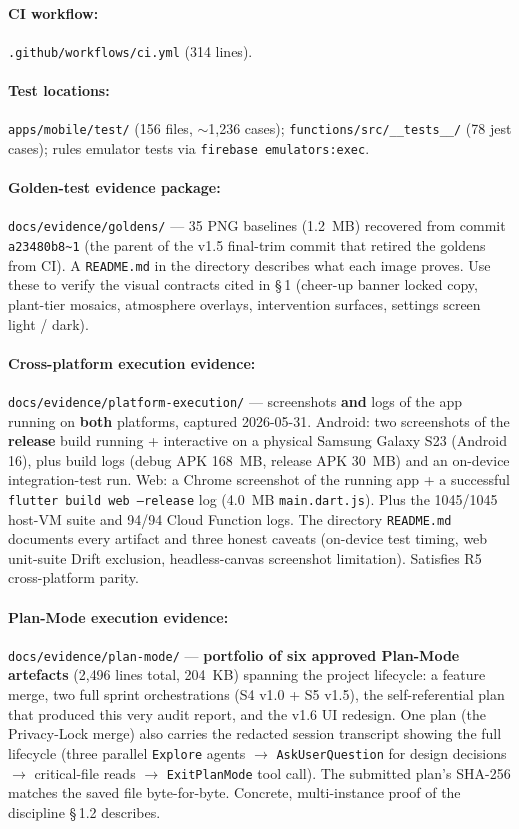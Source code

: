 \documentclass[11pt,a4paper]{article}
\begin{document}
\paragraph{CI workflow:} \texttt{.github/workflows/ci.yml} (314 lines).

\paragraph{Test locations:} \texttt{apps/mobile/test/} (156 files,
$\sim$1{,}236 cases); \texttt{functions/src/\_\_tests\_\_/} (78 jest
cases); rules emulator tests via
\texttt{firebase emulators:exec}.

\paragraph{Golden-test evidence package:}
\texttt{docs/evidence/goldens/} --- 35 PNG baselines (1.2~MB) recovered
from commit \texttt{a23480b8\textasciitilde{}1} (the parent of the v1.5
final-trim commit that retired the goldens from CI). A
\texttt{README.md} in the directory describes what each image proves.
Use these to verify the visual contracts cited in \S\,1 (cheer-up
banner locked copy, plant-tier mosaics, atmosphere overlays,
intervention surfaces, settings screen light / dark).

\paragraph{Cross-platform execution evidence:}
\texttt{docs/evidence/platform-execution/} --- screenshots \textbf{and}
logs of the app running on \textbf{both} platforms, captured 2026-05-31.
Android: two screenshots of the \textbf{release} build running +
interactive on a physical Samsung Galaxy S23 (Android 16), plus build
logs (debug APK 168~MB, release APK 30~MB) and an on-device
integration-test run. Web: a Chrome screenshot of the running app + a
successful \texttt{flutter build web --release} log (4.0~MB
\texttt{main.dart.js}). Plus the 1045/1045 host-VM suite and 94/94
Cloud Function logs. The directory \texttt{README.md} documents every
artifact and three honest caveats (on-device test timing, web
unit-suite Drift exclusion, headless-canvas screenshot limitation).
Satisfies R5 cross-platform parity.

\paragraph{Plan-Mode execution evidence:}
\texttt{docs/evidence/plan-mode/} --- \textbf{portfolio of six approved
Plan-Mode artefacts} (2{,}496 lines total, 204~KB) spanning the project
lifecycle: a feature merge, two full sprint orchestrations (S4 v1.0
+ S5 v1.5), the self-referential plan that produced this very audit
report, and the v1.6 UI redesign. One plan (the Privacy-Lock merge)
also carries the redacted session transcript showing the full
lifecycle (three parallel \texttt{Explore} agents $\to$
\texttt{AskUserQuestion} for design decisions $\to$ critical-file
reads $\to$ \texttt{ExitPlanMode} tool call). The submitted plan's
SHA-256 matches the saved file byte-for-byte. Concrete, multi-instance
proof of the discipline \S\,1.2 describes.
\end{document}
